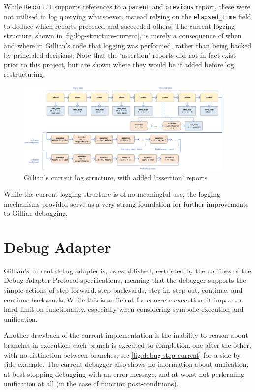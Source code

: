 While \texttt{Report.t} supports references to a \texttt{parent} and
\texttt{previous} report, these were not utilised in log querying whatsoever,
instead relying on the \texttt{elapsed\_time} field to deduce which reports
preceded and succeeded others. The current logging structure, shown in
\autoref{fig:log-structure-current}, is merely a consequence of when and where
in Gillian's code that logging was performed, rather than being backed by
principled decisions. Note that the `assertion' reports did not in fact exist
prior to this project, but are shown where they would be if added before log
restructuring.

\begin{figure}
  \center{}
  \includegraphics[width=0.95\textwidth]{img/log-structure-current.png}
  \caption{Gillian's current log structure, with added `assertion' reports}%
  \label{fig:log-structure-current}
\end{figure}

While the current logging structure is of no meaningful use, the logging
mechanisms provided serve as a very strong foundation for further improvements
to Gillian debugging.


\section{Debug Adapter}\label{sec:current:dap}

Gillian's current debug adapter is, as established, restricted by the confines
of the Debug Adapter Protocol specifications, meaning that the debugger supports
the simple actions of step forward, step backwards, step in, step out, continue,
and continue backwards. While this is sufficient for concrete execution, it
imposes a hard limit on functionality, especially when considering symbolic
execution and unification.

Another drawback of the current implementation is the inability to reason
about branches in execution; each branch is executed to completion, one after
the other, with no distinction between branches; see
\autoref{fig:debug-step-current} for a side-by-side example. The current
debugger also shows no information about unification, at best stopping debugging
with an error message, and at worst not performing unification at all (in the
case of function post-conditions).

